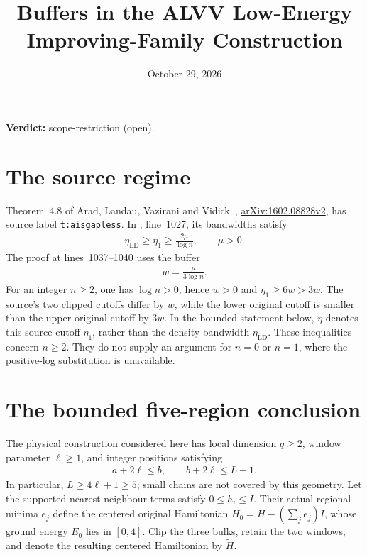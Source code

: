 \documentclass{article}
\title{Buffers in the ALVV Low-Energy Improving-Family Construction}
\author{}
\date{October 29, 2026}
\providecommand{\gapnote}[2]{\par\noindent\textbf{Verdict:} #1 (#2).\par}
\begin{document}
\maketitle
\gapnote{scope-restriction}{open}

\section{The source regime}

Theorem~4.8 of Arad, Landau, Vazirani and Vidick~\cite{Arad2016RigorousRG},
\href{https://arxiv.org/abs/1602.08828v2}{arXiv:1602.08828v2}, has source
label \texttt{t:aisgapless}. In , line~1027,
its bandwidths satisfy
\begin{align}
    \eta_{\mathrm{LD}}\ge\eta_1\ge\frac{2\mu}{\log n},\qquad \mu>0.
    \label{eq:ld_source_bandwidth}
\end{align}
The proof at lines~1037--1040 uses the buffer
\begin{align}
    w=\frac{\mu}{3\log n}.
    \label{eq:ld_source_buffer}
\end{align}
For an integer $n\ge2$, one has $\log n>0$, hence $w>0$ and
$\eta_1\ge6w>3w$. The source's two clipped cutoffs differ by $w$, while
the lower original cutoff is smaller than the upper original cutoff by $3w$.
In the bounded statement below, $\eta$ denotes this source cutoff $\eta_1$,
rather than the density bandwidth $\eta_{\mathrm{LD}}$.
These inequalities concern $n\ge2$. They do not supply an argument for
$n=0$ or $n=1$, where the positive-log substitution is unavailable.

\section{The bounded five-region conclusion}

The physical construction considered here has local dimension $q\ge2$,
window parameter $\ell\ge1$, and integer positions satisfying
\begin{align}
    a+2\ell\le b,\qquad b+2\ell\le L-1.
    \label{eq:ld_five_region_geometry}
\end{align}
In particular, $L\ge4\ell+1\ge5$; small chains are not covered by this
geometry. Let the supported nearest-neighbour terms satisfy $0\le h_i\le I$.
Their actual regional minima $e_j$ define the centered original Hamiltonian
$H_0=H-(\sum_j e_j)I$, whose ground energy $E_0$ lies in $[0,4]$.
Clip the three bulks, retain the two windows, and denote the resulting
centered Hamiltonian by $\widetilde H$.
\end{document}
